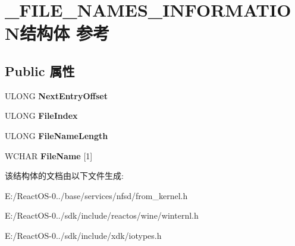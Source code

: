 \hypertarget{struct___f_i_l_e___n_a_m_e_s___i_n_f_o_r_m_a_t_i_o_n}{}\section{\+\_\+\+F\+I\+L\+E\+\_\+\+N\+A\+M\+E\+S\+\_\+\+I\+N\+F\+O\+R\+M\+A\+T\+I\+O\+N结构体 参考}
\label{struct___f_i_l_e___n_a_m_e_s___i_n_f_o_r_m_a_t_i_o_n}
\subsection*{Public 属性}
\begin{DoxyCompactItemize}
\item 
\mbox{\label{struct___f_i_l_e___n_a_m_e_s___i_n_f_o_r_m_a_t_i_o_n_a3031dee2b65ed7b8c245282c8cf8bda4}} 
U\+L\+O\+NG {\bfseries Next\+Entry\+Offset}
\item 
\mbox{\label{struct___f_i_l_e___n_a_m_e_s___i_n_f_o_r_m_a_t_i_o_n_af5df1441c939e3d88d347c78b4cd9162}} 
U\+L\+O\+NG {\bfseries File\+Index}
\item 
\mbox{\label{struct___f_i_l_e___n_a_m_e_s___i_n_f_o_r_m_a_t_i_o_n_aadfd4ec54537c5d883cdb14d9a8851ee}} 
U\+L\+O\+NG {\bfseries File\+Name\+Length}
\item 
\mbox{\label{struct___f_i_l_e___n_a_m_e_s___i_n_f_o_r_m_a_t_i_o_n_a7eeaf7ecbc28dddc5bc9b4cba71f8758}} 
W\+C\+H\+AR {\bfseries File\+Name} \mbox{[}1\mbox{]}
\end{DoxyCompactItemize}


该结构体的文档由以下文件生成\+:\begin{DoxyCompactItemize}
\item 
E\+:/\+React\+O\+S-\/0../base/services/nfsd/from\+\_\+kernel.\+h\item 
E\+:/\+React\+O\+S-\/0../sdk/include/reactos/wine/winternl.\+h\item 
E\+:/\+React\+O\+S-\/0../sdk/include/xdk/iotypes.\+h\end{DoxyCompactItemize}
